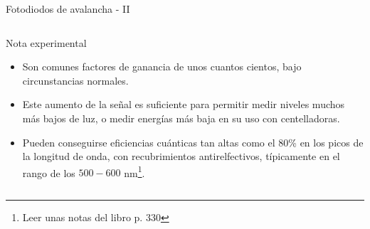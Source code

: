 \documentclass[a4paper,10pt]{beamer}
\begin{document}
\begin{frame}{Fotodiodos de avalancha - II}
\begin{columns}[c]
 \begin{exampleblock}{Nota experimental}
 \footnotesize
  \begin{itemize}
   \item \begin{justify}
          Son comunes factores de ganancia de unos cuantos cientos, bajo circunstancias 
          normales.
         \end{justify}
    \item \begin{justify}
          Este aumento de la señal es suficiente para permitir medir niveles muchos 
          más bajos de luz, o medir energías más baja en su uso con centelladoras.
         \end{justify}
    \item \begin{justify}
          Pueden conseguirse eficiencias cuánticas tan altas como el 80\% en los 
          picos de la longitud de onda, con recubrimientos antirelfectivos, típicamente
          en el rango de los $500-600$ nm\footnote{Leer unas notas del libro p. 330}.
        \end{justify}
  \end{itemize}

 \end{exampleblock}

 
\end{columns}
\end{frame}
\end{document}
